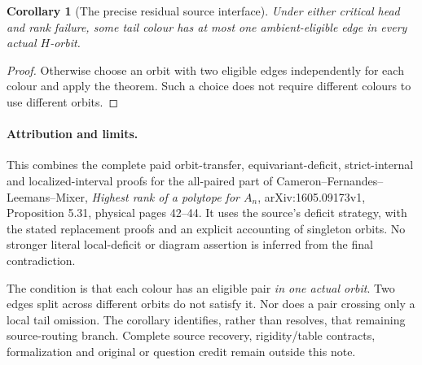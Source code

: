 \documentclass[11pt,a4paper]{article}
\newtheorem{corollary}[theorem]{Corollary}
\begin{document}
\begin{corollary}[The precise residual source interface]
Under either critical head and rank failure, some tail colour has
at most one ambient-eligible edge in every actual $H$-orbit.
\end{corollary}
\begin{proof}
Otherwise choose an orbit with two eligible edges independently
for each colour and apply the theorem. Such a choice does not
require different colours to use different orbits.
\end{proof}

\paragraph{Attribution and limits.}
This combines the complete paid orbit-transfer, equivariant-deficit,
strict-internal and localized-interval proofs for the all-paired
part of Cameron--Fernandes--Leemans--Mixer,
\emph{Highest rank of a polytope for $A_n$}, arXiv:1605.09173v1,
Proposition 5.31, physical pages 42--44. It uses the source's
deficit strategy, with the stated replacement proofs and an explicit
accounting of singleton orbits. No stronger literal local-deficit
or diagram assertion is inferred from the final contradiction.

The condition is that each colour has an eligible pair \emph{in one
actual orbit}. Two edges split across different orbits do not
satisfy it. Nor does a pair crossing only a local tail omission.
The corollary identifies, rather than resolves, that remaining
source-routing branch. Complete source recovery, rigidity/table
contracts, formalization and original or question credit remain
outside this note.
\end{document}
